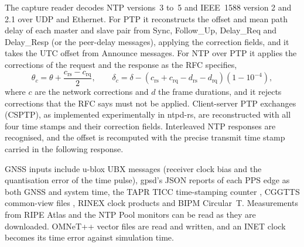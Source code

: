 \documentclass[11pt,a4paper]{article}
\begin{document}
The capture reader decodes NTP versions~3 to~5 and IEEE~1588 version 2 and 2.1 over UDP and Ethernet. For
PTP it reconstructs the offset and mean path delay of each master and slave pair from Sync, Follow\_Up,
Delay\_Req and Delay\_Resp (or the peer-delay messages), applying the correction fields, and it takes the
UTC offset from Announce messages. For NTP over PTP \citep{rfc10030} it applies the corrections of the
request and the response as the RFC specifies,
\begin{equation}
\theta_c = \theta + \frac{c_\mathrm{rs} - c_\mathrm{rq}}{2}, \qquad
\delta_c = \delta - (c_\mathrm{rs} + c_\mathrm{rq} - d_\mathrm{rs} - d_\mathrm{rq})(1 - 10^{-4}),
\end{equation}
where $c$ are the network corrections and $d$ the frame durations, and it rejects corrections that the
RFC says must not be applied. Client-server PTP exchanges (CSPTP), as implemented experimentally in
ntpd-rs, are reconstructed with all four time stamps and their correction fields. Interleaved NTP
responses \citep{rfc9769} are recognised, and the offset is recomputed with the precise transmit time
stamp carried in the following response.

GNSS inputs include u-blox UBX messages \citep{ubxf9t} (receiver clock bias and the quantisation error
of the time pulse), gpsd's JSON reports of each PPS edge as both GNSS and system time, the TAPR TICC
time-stamping counter \citep{ticc}, CGGTTS common-view files \citep{defraigne2015}, RINEX clock products
and BIPM Circular~T. Measurements from RIPE Atlas \citep{ripeatlas2015} and the NTP Pool monitors can be
read as they are downloaded. OMNeT++ vector files are read and written, and an INET clock becomes its
time error against simulation time.
\end{document}
